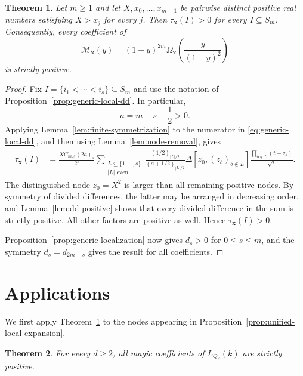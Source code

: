 \documentclass[10pt,a4paper]{amsart}
\newtheorem{Theorem}{Theorem}[section]
\theoremstyle{definition}
\newcommand{\DD}{\Delta}
\begin{document}
\begin{Theorem}\label{thm:node-positivity}
Let $m\ge1$ and let $X,x_0,\ldots,x_{m-1}$
be pairwise distinct positive real numbers satisfying $X>x_j$ for every
$j$.  Then $\tau_{\mathbf x}(I)>0$ for every $I\subseteq S_m$.
Consequently, every coefficient of
\[
\mathcal M_{\mathbf x}(y)
=
(1-y)^{2m}
\Omega_{\mathbf x}\left(\frac{y}{(1-y)^2}\right)
\]
is strictly positive.
\end{Theorem}

\begin{proof}
Fix $I=\{i_1<\cdots<i_s\}\subseteq S_m$ and use the notation of
Proposition~\ref{prop:generic-local-dd}.  In particular,
\[
a=m-s+\frac12>0.
\]
Applying Lemma~\ref{lem:finite-symmetrization} to the numerator in
\eqref{eq:generic-local-dd}, and then using
Lemma~\ref{lem:node-removal}, gives
\[
\begin{aligned}
\tau_{\mathbf x}(I)
&=
\frac{XC_{m,s}(2a)_s}{2^s}
\sum_{\substack{L\subseteq\{1,\ldots,s\}\\|L|\text{ even}}}
\frac{(1/2)_{|L|/2}}{(a+1/2)_{|L|/2}} 
\DD[z_0,(z_b)_{b\notin L}]
\frac{\prod_{b\notin L}(t+z_b)}{\sqrt t}.
\end{aligned}
\]
The distinguished node $z_0=X^2$ is larger than all remaining positive
nodes.  By symmetry of divided differences, the latter may be arranged in
decreasing order, and Lemma~\ref{lem:dd-positive} shows that every divided
difference in the sum is strictly positive.  All other factors are positive
as well.  
Hence $\tau_{\mathbf x}(I)>0$.

Proposition~\ref{prop:generic-localization} now gives $d_s>0$ for
$0\le s\le m$, and the symmetry $d_s=d_{2m-s}$ gives the result for all
coefficients.
\end{proof}


\section{Applications}\label{sec:applications}

We first apply Theorem~\ref{thm:node-positivity} to the nodes
appearing in Proposition~\ref{prop:unified-local-expansion}.

\begin{Theorem}\label{thm:Q-magic}
For every $d\ge2$, all magic coefficients of $L_{Q_d}(k)$ are strictly
positive.
\end{Theorem}
\end{document}
